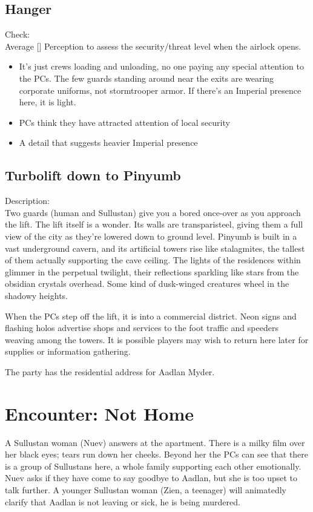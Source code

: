 \documentclass{book}
\newcommand{\df}{\difficulty}
\begin{document}
\begin{multicols*}{2}
\subsection{Hanger}
Check:\\
Average [\df\df] Perception to assess the security/threat level when the airlock opens.
\begin{itemize}
    \item \success It’s just crews loading and unloading, no one paying any special attention to the PCs. The few guards standing around near the exits are wearing corporate uniforms, not stormtrooper armor. If there’s an Imperial presence here, it is light.
    \item \failure PCs think they have attracted attention of local security
    \item \threat A detail that suggests heavier Imperial presence
\end{itemize}

\subsection{Turbolift down to Pinyumb}
Description:\\
Two guards (human and Sullustan) give you a bored once-over as you approach the lift. The lift itself is a wonder. Its walls are transparisteel, giving them a full view of the city as they’re lowered down to ground level. Pinyumb is built in a vast underground cavern, and its artificial towers rise like stalagmites, the tallest of them actually supporting the cave ceiling. The lights of the residences within glimmer in the perpetual twilight, their reflections sparkling like stars from the obsidian crystals overhead. Some kind of dusk-winged creatures wheel in the shadowy heights.

When the PCs step off the lift, it is into a commercial district. Neon signs and flashing holos advertise shops and services to the foot traffic and speeders weaving among the towers. It is possible players may wish to return here later for supplies or information gathering.

The party has the residential address for Aadlan Myder.

\section{Encounter: Not Home}

A Sullustan woman (Nuev) answers at the apartment. There is a milky film over her black eyes; tears run down her cheeks. Beyond her the PCs can see that there is a group of Sullustans here, a whole family supporting each other emotionally.  Nuev asks if they have come to say goodbye to Aadlan, but she is too upset to talk further.  A younger Sullustan woman (Zien, a teenager) will animatedly clarify that Aadlan is not leaving or sick, he is being murdered.


\end{multicols*}
\end{document}
